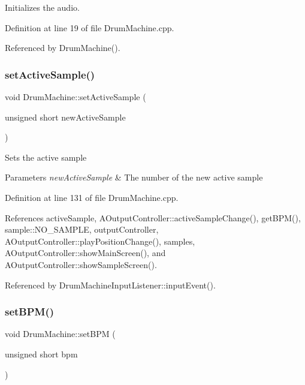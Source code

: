Initializes the audio. 



Definition at line 19 of file Drum\+Machine.\+cpp.



Referenced by Drum\+Machine().

\mbox{\label{class_drum_machine_a1b6ff2afd815b9981e8a008c857c1847}} 
\subsubsection{\texorpdfstring{set\+Active\+Sample()}{setActiveSample()}}
{\footnotesize\ttfamily void Drum\+Machine\+::set\+Active\+Sample (\begin{DoxyParamCaption}\item[{unsigned short}]{new\+Active\+Sample }\end{DoxyParamCaption})}

Sets the active sample 
\begin{DoxyParams}{Parameters}
{\em new\+Active\+Sample} & The number of the new active sample \\
\hline
\end{DoxyParams}


Definition at line 131 of file Drum\+Machine.\+cpp.



References active\+Sample, A\+Output\+Controller\+::active\+Sample\+Change(), get\+B\+P\+M(), sample\+::\+N\+O\+\_\+\+S\+A\+M\+P\+LE, output\+Controller, A\+Output\+Controller\+::play\+Position\+Change(), samples, A\+Output\+Controller\+::show\+Main\+Screen(), and A\+Output\+Controller\+::show\+Sample\+Screen().



Referenced by Drum\+Machine\+Input\+Listener\+::input\+Event().

\mbox{\label{class_drum_machine_aac554a614388d11543698f407b0e11e6}} 
\subsubsection{\texorpdfstring{set\+B\+P\+M()}{setBPM()}}
{\footnotesize\ttfamily void Drum\+Machine\+::set\+B\+PM (\begin{DoxyParamCaption}\item[{unsigned short}]{bpm }\end{DoxyParamCaption})}

